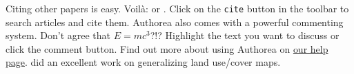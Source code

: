 Citing other papers is easy. Voilà: \cite{2012} or \cite{Holstein_2009}. Click on the \verb|cite| button in the toolbar to search articles and cite them. Authorea also comes with a powerful commenting system. Don't agree that $E  =  mc^{3}$?!? Highlight the text you want to discuss or click the comment button. Find out more about using Authorea on \href{https://www.authorea.com/help}{our help page}.\citep{Ai_2002} did an excellent work on generalizing land use/cover maps.

